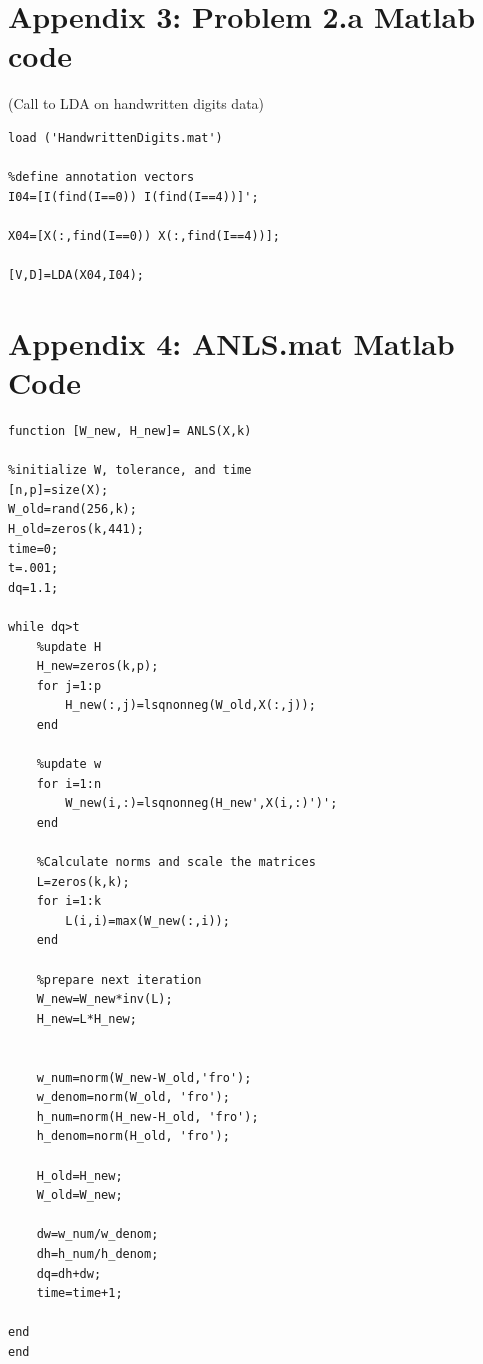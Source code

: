 \documentclass{article}
\begin{document}
\pagebreak
\section*{Appendix 3: Problem 2.a Matlab code}(Call to LDA on handwritten digits data)
\begin{verbatim}
load ('HandwrittenDigits.mat')

%define annotation vectors
I04=[I(find(I==0)) I(find(I==4))]';

X04=[X(:,find(I==0)) X(:,find(I==4))];

[V,D]=LDA(X04,I04);
\end{verbatim}


\pagebreak
\section*{Appendix 4: ANLS.mat Matlab Code}
\begin{verbatim}
function [W_new, H_new]= ANLS(X,k)

%initialize W, tolerance, and time
[n,p]=size(X);
W_old=rand(256,k);
H_old=zeros(k,441);
time=0;
t=.001;
dq=1.1;

while dq>t
    %update H 
    H_new=zeros(k,p);
    for j=1:p 
        H_new(:,j)=lsqnonneg(W_old,X(:,j));
    end
    
    %update w
    for i=1:n
        W_new(i,:)=lsqnonneg(H_new',X(i,:)')';
    end
    
    %Calculate norms and scale the matrices
    L=zeros(k,k);
    for i=1:k
        L(i,i)=max(W_new(:,i));
    end
    
    %prepare next iteration
    W_new=W_new*inv(L);
    H_new=L*H_new;
    
    
    w_num=norm(W_new-W_old,'fro');
    w_denom=norm(W_old, 'fro');
    h_num=norm(H_new-H_old, 'fro');
    h_denom=norm(H_old, 'fro');
    
    H_old=H_new;
    W_old=W_new;

    dw=w_num/w_denom;
    dh=h_num/h_denom;    
    dq=dh+dw;
    time=time+1;   

end
end
\end{verbatim}

\pagebreak
\end{document}
